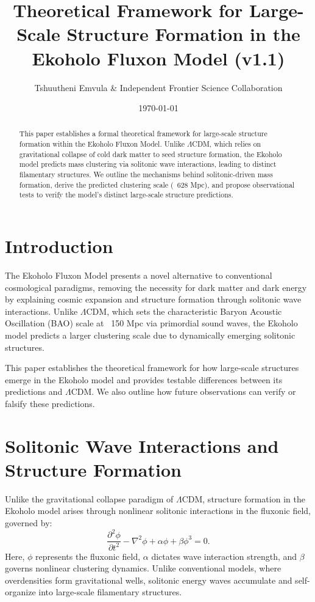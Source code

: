 \documentclass{article}
\title{Theoretical Framework for Large-Scale Structure Formation in the Ekoholo Fluxon Model (v1.1)}
\author{Tshuutheni Emvula \& Independent Frontier Science Collaboration}
\date{\today}
\begin{document}
\maketitle

\begin{abstract}
This paper establishes a formal theoretical framework for large-scale structure formation within the Ekoholo Fluxon Model. Unlike \(\Lambda\)CDM, which relies on gravitational collapse of cold dark matter to seed structure formation, the Ekoholo model predicts mass clustering via solitonic wave interactions, leading to distinct filamentary structures. We outline the mechanisms behind solitonic-driven mass formation, derive the predicted clustering scale (~628 Mpc), and propose observational tests to verify the model’s distinct large-scale structure predictions.
\end{abstract}

\section{Introduction}
The Ekoholo Fluxon Model presents a novel alternative to conventional cosmological paradigms, removing the necessity for dark matter and dark energy by explaining cosmic expansion and structure formation through solitonic wave interactions. Unlike \(\Lambda\)CDM, which sets the characteristic Baryon Acoustic Oscillation (BAO) scale at ~150 Mpc via primordial sound waves, the Ekoholo model predicts a larger clustering scale due to dynamically emerging solitonic structures.

This paper establishes the theoretical framework for how large-scale structures emerge in the Ekoholo model and provides testable differences between its predictions and \(\Lambda\)CDM. We also outline how future observations can verify or falsify these predictions.

\section{Solitonic Wave Interactions and Structure Formation}
Unlike the gravitational collapse paradigm of \(\Lambda\)CDM, structure formation in the Ekoholo model arises through nonlinear solitonic interactions in the fluxonic field, governed by:
\begin{equation}
    \frac{\partial^2 \phi}{\partial t^2} - \nabla^2 \phi + \alpha \phi + \beta \phi^3 = 0.
\end{equation}
Here, \(\phi\) represents the fluxonic field, \(\alpha\) dictates wave interaction strength, and \(\beta\) governs nonlinear clustering dynamics. Unlike conventional models, where overdensities form gravitational wells, solitonic energy waves accumulate and self-organize into large-scale filamentary structures.
\end{document}
